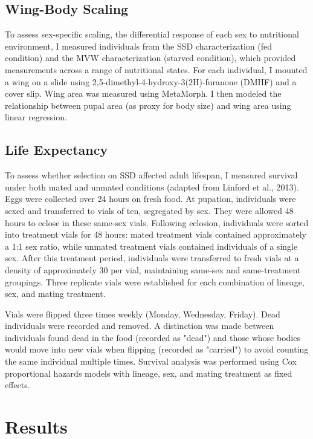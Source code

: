 \documentclass[12pt,reqno,oneside]{report}
\begin{document}
\subsection{Wing-Body Scaling}

To assess sex-specific scaling, the differential response of each sex to nutritional environment, I measured individuals from the SSD characterization (fed condition) and the MVW characterization (starved condition), which provided measurements across a range of nutritional states. For each individual, I mounted a wing on a slide using 2,5-dimethyl-4-hydroxy-3(2H)-furanone (DMHF) and a cover slip. Wing area was measured using MetaMorph. I then modeled the relationship between pupal area (as proxy for body size) and wing area using linear regression.

\subsection{Life Expectancy}

To assess whether selection on SSD affected adult lifespan, I measured survival under both mated and unmated conditions (adapted from Linford et al., 2013). Eggs were collected over 24 hours on fresh food. At pupation, individuals were sexed and transferred to vials of ten, segregated by sex. They were allowed 48 hours to eclose in these same-sex vials. Following eclosion, individuals were sorted into treatment vials for 48 hours: mated treatment vials contained approximately a 1:1 sex ratio, while unmated treatment vials contained individuals of a single sex. After this treatment period, individuals were transferred to fresh vials at a density of approximately 30 per vial, maintaining same-sex and same-treatment groupings. Three replicate vials were established for each combination of lineage, sex, and mating treatment.

Vials were flipped three times weekly (Monday, Wednesday, Friday). Dead individuals were recorded and removed. A distinction was made between individuals found dead in the food (recorded as "dead") and those whose bodies would move into new vials when flipping (recorded as "carried") to avoid counting the same individual multiple times. Survival analysis was performed using Cox proportional hazards models with lineage, sex, and mating treatment as fixed effects.

\section{Results}
\end{document}
